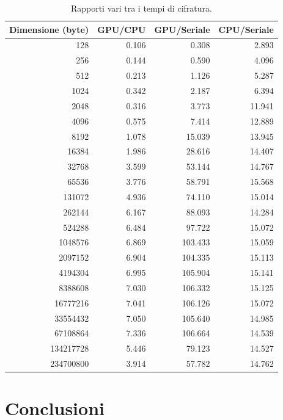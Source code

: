 \documentclass[12pt,a4paper,oneside]{book}
\begin{document}
\begin{table}[p]
\begin{center}
\begin{tabular}{|r|r|r|r|}
\hline
\textbf{Dimensione (byte)} & \textbf{GPU/CPU} & \textbf{GPU/Seriale} & \textbf{CPU/Seriale} \\
\hline
128 & 0.106 & 0.308 & 2.893 \\
\hline
256 & 0.144 & 0.590 & 4.096 \\
\hline
512 & 0.213 & 1.126 & 5.287 \\
\hline
1024 & 0.342 & 2.187 & 6.394 \\
\hline
2048 & 0.316 & 3.773 & 11.941 \\
\hline
4096 & 0.575 & 7.414 & 12.889 \\
\hline
8192 & 1.078 & 15.039 & 13.945 \\
\hline
16384 & 1.986 & 28.616 & 14.407 \\
\hline
32768 & 3.599 & 53.144 & 14.767 \\
\hline
65536 & 3.776 & 58.791 & 15.568 \\
\hline
131072 & 4.936 & 74.110 & 15.014 \\
\hline
262144 & 6.167 & 88.093 & 14.284 \\
\hline
524288 & 6.484 & 97.722 & 15.072 \\
\hline
1048576 & 6.869 & 103.433 & 15.059 \\
\hline
2097152 & 6.904 & 104.335 & 15.113 \\
\hline
4194304 & 6.995 & 105.904 & 15.141 \\
\hline
8388608 & 7.030 & 106.332 & 15.125 \\
\hline
16777216 & 7.041 & 106.126 & 15.072 \\
\hline
33554432 & 7.050 & 105.640 & 14.985 \\
\hline
67108864 & 7.336 & 106.664 & 14.539 \\
\hline
134217728 & 5.446 & 79.123 & 14.527 \\
\hline
234700800 & 3.914 & 57.782 & 14.762 \\
\hline
\end{tabular}
\caption{Rapporti vari tra i tempi di cifratura.\label{tab:test-ratio}}
\end{center}
\end{table}

\backmatter
\chapter{Conclusioni}
\end{document}
